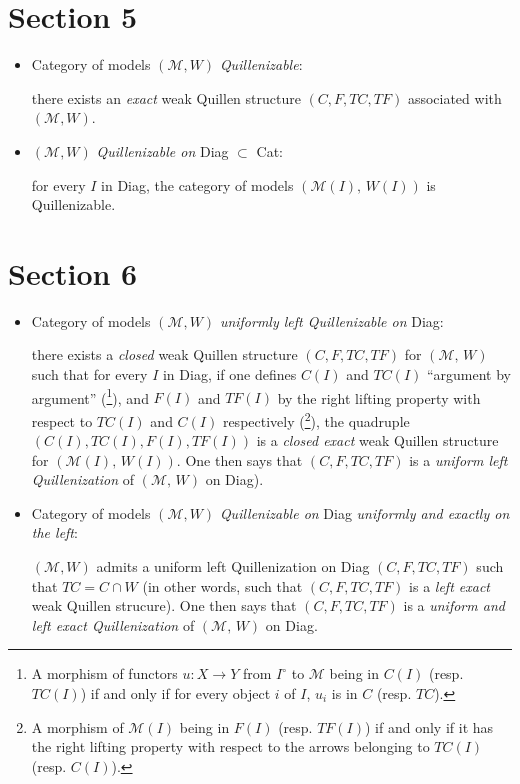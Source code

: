 \documentclass[11pt]{article}
\newcommand{\printedpage}[1]{\marginpar{\footnotesize p.~#1}}
\newcommand{\Mo}{\mathcal{M}}
\begin{document}
\section*{Section 5}

\begin{itemize}
\item[\textbullet] Category of models $(\Mo,W)$ \textit{Quillenizable}:

there exists an \textit{exact} weak Quillen structure $(C,F,TC,TF)$ associated with $(\Mo,W)$.

\item[\textbullet] $(\Mo,W)$ \textit{Quillenizable on} Diag $\subset$ Cat:

for every $I$ in Diag, the category of models $(\Mo(I),\, W(I))$ is Quillenizable.
\end{itemize}

\section*{Section 6}

\begin{itemize}
\item[\textbullet] Category of models $(\Mo,W)$ \textit{uniformly left Quillenizable on} Diag:

there exists a \textit{closed} weak Quillen structure $(C,F,TC,TF)$ for $(\Mo,\, W)$ such that for every $I$ in Diag, if one defines $C(I)$ and $TC(I)$ ``argument by argument'' (\footnote{A morphism of functors $u : X \longrightarrow Y$ from $I^{\circ}$ to $\Mo$ being in $C(I)$ (resp. $TC(I)$) if and only if for every object $i$ of $I$, $u_i$ is in $C$ (resp. $TC$).}), and $F(I)$ and $TF(I)$ by the right lifting property with respect to $TC(I)$ and $C(I)$ respectively (\footnote{A morphism of $\Mo(I)$ being in $F(I)$ (resp. $TF(I)$) if and only if it has the right lifting property with respect to the arrows belonging to $TC(I)$ (resp. $C(I)$).}), the quadruple $(C(I),TC(I),F(I),TF(I))$ is a \textit{closed exact} weak Quillen structure for $(\Mo(I),\, W(I))$. One then says that $(C,F,TC,TF)$ is a \textit{uniform left Quillenization} of $(\Mo,\, W)$ on Diag).
\end{itemize}

\printedpage{62}

\begin{itemize}
\item[\textbullet] Category of models $(\Mo,W)$ \textit{Quillenizable on} Diag \textit{uniformly and exactly on the left}:

$(\Mo,W)$ admits a uniform left Quillenization on Diag $(C,F,TC,TF)$ such that $TC = C \cap W$ (in other words, such that $(C,F,TC,TF)$ is a \textit{left exact} weak Quillen strucure). One then says that $(C,F,TC,TF)$ is a \textit{uniform and left exact Quillenization} of $(\Mo,\, W)$ on Diag. %
\end{itemize}
\end{document}
